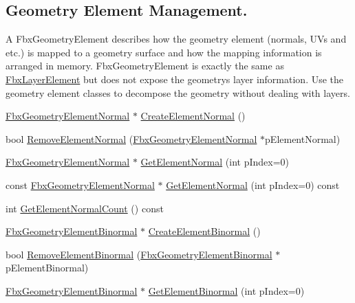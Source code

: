 \subsection*{Geometry Element Management.}
\label{_amgrp5c89d833850d940ed0bcf07e321db4e1}%
 A Fbx\+Geometry\+Element describes how the geometry element (normals, U\+Vs and etc.) is mapped to a geometry surface and how the mapping information is arranged in memory. Fbx\+Geometry\+Element is exactly the same as \hyperlink{class_fbx_layer_element}{Fbx\+Layer\+Element} but does not expose the geometry\textquotesingle{}s layer information. Use the geometry element classes to decompose the geometry without dealing with layers. \begin{DoxyCompactItemize}
\item 
\hyperlink{fbxlayer_8h_a54a5aaec6f1979871fe9d93dd2d246c9}{Fbx\+Geometry\+Element\+Normal} $\ast$ \hyperlink{class_fbx_geometry_base_a13810d0c6ac68ab14be3f1316b977f7d}{Create\+Element\+Normal} ()
\item 
bool \hyperlink{class_fbx_geometry_base_a9aadbaa3f50db80b67bd1b3bc9119c7b}{Remove\+Element\+Normal} (\hyperlink{fbxlayer_8h_a54a5aaec6f1979871fe9d93dd2d246c9}{Fbx\+Geometry\+Element\+Normal} $\ast$p\+Element\+Normal)
\item 
\hyperlink{fbxlayer_8h_a54a5aaec6f1979871fe9d93dd2d246c9}{Fbx\+Geometry\+Element\+Normal} $\ast$ \hyperlink{class_fbx_geometry_base_ab7486b08caa6e90923fbb194bd81a61e}{Get\+Element\+Normal} (int p\+Index=0)
\item 
const \hyperlink{fbxlayer_8h_a54a5aaec6f1979871fe9d93dd2d246c9}{Fbx\+Geometry\+Element\+Normal} $\ast$ \hyperlink{class_fbx_geometry_base_a33d41a1c8b2346aa73a2576225387fb4}{Get\+Element\+Normal} (int p\+Index=0) const
\item 
int \hyperlink{class_fbx_geometry_base_ae8cffdf94daa997de808328579c636c2}{Get\+Element\+Normal\+Count} () const
\item 
\hyperlink{fbxlayer_8h_a066e30a64eb051458583b656a651e90b}{Fbx\+Geometry\+Element\+Binormal} $\ast$ \hyperlink{class_fbx_geometry_base_aaac14a98782b9f68803462f033297d05}{Create\+Element\+Binormal} ()
\item 
bool \hyperlink{class_fbx_geometry_base_a07a88ca035b8b21b407a88bef375831f}{Remove\+Element\+Binormal} (\hyperlink{fbxlayer_8h_a066e30a64eb051458583b656a651e90b}{Fbx\+Geometry\+Element\+Binormal} $\ast$p\+Element\+Binormal)
\item 
\hyperlink{fbxlayer_8h_a066e30a64eb051458583b656a651e90b}{Fbx\+Geometry\+Element\+Binormal} $\ast$ \hyperlink{class_fbx_geometry_base_a810b4a313e01bbaa41fe25ac753a8996}{Get\+Element\+Binormal} (int p\+Index=0)

\end{DoxyCompactItemize}
